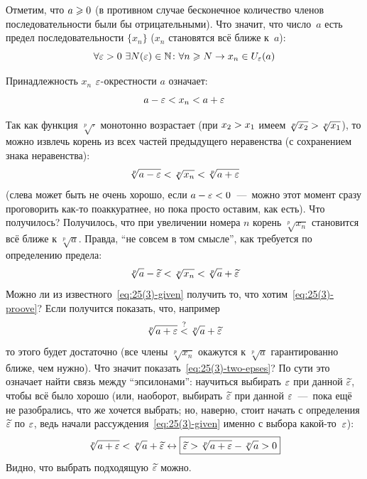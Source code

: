 \documentclass[a4paper,12pt]{article}
\begin{document}
  \begin{solution}
    Отметим, что $a \hm\geq 0$ (в противном случае бесконечное количество членов последовательности были бы отрицательными).
    Что значит, что число~$a$ есть предел последовательности $\{x_n\}$ ($x_n$ становятся всё ближе к~$a$):
    \[
      \forall \varepsilon > 0\ \exists N(\varepsilon) \in \mathbb N\colon \forall n \geqslant N \to x_n \in U_{\varepsilon}(a)
    \]
    
    Принадлежность $x_n$ $\varepsilon$-окрестности $a$ означает:
    \[
      a - \varepsilon < x_n < a + \varepsilon
    \]
    
    Так как функция $\sqrt[p]{\cdot}$ монотонно возрастает (при $x_2 \hm> x_1$ имеем $\sqrt[p]{x_2} \hm> \sqrt[p]{x_1}$), то можно извлечь корень из всех частей предыдущего неравенства (с сохранением знака неравенства):
    \begin{equation}\label{eq:25(3)-given}
      \sqrt[p]{a - \varepsilon} < \sqrt[p]{x_n} < \sqrt[p]{a + \varepsilon}
    \end{equation}
    (слева может быть не очень хорошо, если $a \hm- \eps \hm< 0$~---~можно этот момент сразу проговорить как-то поаккуратнее, но пока просто оставим, как есть).
    Что получилось?
    Получилось, что при увеличении номера $n$ корень $\sqrt[p]{x_n}$ становится всё ближе к $\sqrt[p]{a}$.
    Правда, ``не совсем в том смысле'', как требуется по определению предела:
    \begin{equation}\label{eq:25(3)-proove}
      \sqrt[p]{a} - \widetilde {\varepsilon} < \sqrt[p]{x_n} < \sqrt[p]{a} + \widetilde {\varepsilon}
    \end{equation}
    Можно ли из известного~\eqref{eq:25(3)-given} получить то, что хотим~\eqref{eq:25(3)-proove}?
    Если получится показать, что, например
    \begin{equation}\label{eq:25(3)-two-epses}
      \sqrt[p]{a + \varepsilon} \overset{\operatorname{?}}{<} \sqrt[p]{a} + \widetilde {\varepsilon}
    \end{equation}
    то этого будет достаточно (все члены $\sqrt[p]{x_n}$ окажутся к $\sqrt[p]{a}$ гарантированно ближе, чем нужно).
    Что значит показать~\eqref{eq:25(3)-two-epses}?
    По сути это означает найти связь между ``эпсилонами'': научиться выбирать $\varepsilon$ при данной $\widetilde {\varepsilon}$, чтобы всё было хорошо (или, наоборот, выбирать $\widetilde {\varepsilon}$ при данной $\varepsilon$~---~пока ещё не разобрались, что же хочется выбрать; но, наверно, стоит начать с определения $\widetilde {\varepsilon}$ по $\varepsilon$, ведь начали рассуждения~\eqref{eq:25(3)-given} именно с выбора какой-то~$\varepsilon$):
    \[
      \sqrt[p]{a + \varepsilon} < \sqrt[p]{a} + \widetilde {\varepsilon} \leftrightarrow \boxed{\widetilde {\varepsilon} > \sqrt[p]{a + \varepsilon} - \sqrt[p]{a} > 0}
    \]
    Видно, что выбрать подходящую $\widetilde {\varepsilon}$ можно.
    

\end{solution}
\end{document}

